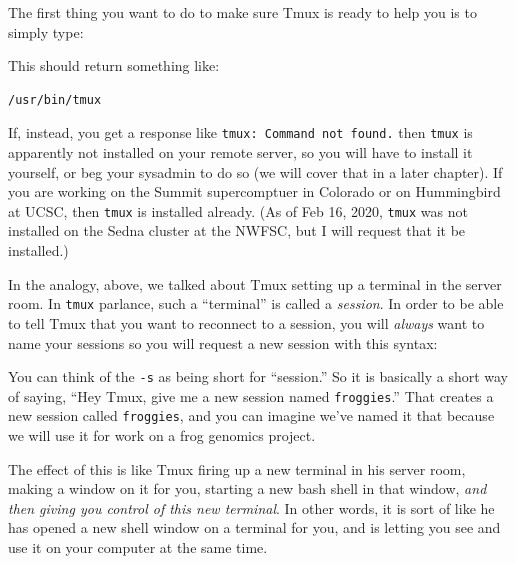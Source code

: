 \documentclass[]{krantz}
\makeatletter
\newenvironment{Shaded}{\begin{snugshade}}{\end{snugshade}}
\newcommand{\ExtensionTok}[1]{#1}
\newcommand{\NormalTok}[1]{#1}
\newenvironment{kframe}{%
\medskip{}
\setlength{\fboxsep}{.8em}
 \def\at@end@of@kframe{}%
 \ifinner\ifhmode%
  \def\at@end@of@kframe{\end{minipage}}%
  \begin{minipage}{\columnwidth}%
 \fi\fi%
 \def\FrameCommand##1{\hskip\@totalleftmargin \hskip-\fboxsep
 \colorbox{shadecolor}{##1}\hskip-\fboxsep
     \hskip-\linewidth \hskip-\@totalleftmargin \hskip\columnwidth}%
 \MakeFramed {\advance\hsize-\width
   \@totalleftmargin\z@ \linewidth\hsize
   \@setminipage}}%
 {\par\unskip\endMakeFramed%
 \at@end@of@kframe}
\renewenvironment{Shaded}{\begin{kframe}}{\end{kframe}}
\makeatother
\begin{document}
The first thing you want to
do to make sure Tmux is ready to help you is to simply type:

\begin{Shaded}
\begin{Highlighting}[]
\ExtensionTok{%
\end{Highlighting}
\end{Shaded}

This should return something like:

\begin{verbatim}
/usr/bin/tmux
\end{verbatim}

If, instead, you get a response like \texttt{tmux:\ Command\ not\ found.} then \texttt{tmux}
is apparently not installed
on your remote server, so you
will have to install it yourself, or beg your sysadmin to do so (we will cover
that in a later chapter). If you
are working on the Summit supercomptuer in Colorado or on Hummingbird at
UCSC, then \texttt{tmux} is installed already. (As of Feb 16, 2020, \texttt{tmux} was
not installed on the Sedna cluster at the NWFSC, but I will request that it
be installed.)

In the analogy, above, we talked about Tmux setting up a terminal
in the server room. In \texttt{tmux} parlance, such a ``terminal'' is called
a \emph{session}. In order to be able to tell Tmux that you want to reconnect
to a session, you
will \emph{always} want to name your sessions so you will request a new
session with this syntax:

\begin{Shaded}
\begin{Highlighting}[]
\ExtensionTok{%
\end{Highlighting}
\end{Shaded}

You can think of the \texttt{-s} as being short for ``session.'' So it is basically a short
way of saying, ``Hey Tmux, give me a new session named \texttt{froggies}.''
That creates a new session called \texttt{froggies}, and you can imagine we've
named it that because we will use it for work on a frog genomics project.

The effect of this
is like Tmux firing up a new terminal in his server room, making a
window on it for you, starting a new bash shell in that window,
\emph{and then giving you control of this new terminal}.
In other words, it is sort of like he has opened a new shell window on a
terminal for you, and is letting you see and use it on your computer at the same time.
\end{document}

